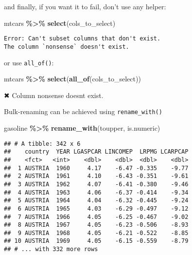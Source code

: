 \documentclass[
]{article}
\newenvironment{Shaded}{\begin{snugshade}}{\end{snugshade}}
\newcommand{\DataTypeTok}[1]{\textcolor[rgb]{0.13,0.29,0.53}{#1}}
\newcommand{\KeywordTok}[1]{\textcolor[rgb]{0.13,0.29,0.53}{\textbf{#1}}}
\newcommand{\NormalTok}[1]{#1}
\newcommand{\OperatorTok}[1]{\textcolor[rgb]{0.81,0.36,0.00}{\textbf{#1}}}
\newcommand{\StringTok}[1]{\textcolor[rgb]{0.31,0.60,0.02}{#1}}
\begin{document}
and finally, if you want it to fail, don't use any helper:

\begin{Shaded}
\begin{Highlighting}[]
\NormalTok{mtcars }\OperatorTok{\%\textgreater{}\%}
\StringTok{  }\KeywordTok{select}\NormalTok{(cols\_to\_select)}
\end{Highlighting}
\end{Shaded}

\begin{verbatim}
Error: Can't subset columns that don't exist.
The column `nonsense` doesn't exist.
\end{verbatim}

or use \texttt{all\_of()}:

\begin{Shaded}
\begin{Highlighting}[]
\NormalTok{mtcars }\OperatorTok{\%\textgreater{}\%}
\StringTok{  }\KeywordTok{select}\NormalTok{(}\KeywordTok{all\_of}\NormalTok{(cols\_to\_select))}
\end{Highlighting}
\end{Shaded}

\begin{Shaded}
\begin{Highlighting}[]
\NormalTok{✖ Column }\StringTok{\textasciigrave{}}\DataTypeTok{nonsense}\StringTok{\textasciigrave{}}\NormalTok{ doesn}\StringTok{\textquotesingle{}t exist.}
\end{Highlighting}
\end{Shaded}

Bulk-renaming can be achieved using \texttt{rename\_with()}

\begin{Shaded}
\begin{Highlighting}[]
\NormalTok{gasoline }\OperatorTok{\%\textgreater{}\%}
\StringTok{  }\KeywordTok{rename\_with}\NormalTok{(toupper, is.numeric)}
\end{Highlighting}
\end{Shaded}

\begin{verbatim}
## # A tibble: 342 x 6
##    country  YEAR LGASPCAR LINCOMEP  LRPMG LCARPCAP
##    <fct>   <int>    <dbl>    <dbl>  <dbl>    <dbl>
##  1 AUSTRIA  1960     4.17    -6.47 -0.335    -9.77
##  2 AUSTRIA  1961     4.10    -6.43 -0.351    -9.61
##  3 AUSTRIA  1962     4.07    -6.41 -0.380    -9.46
##  4 AUSTRIA  1963     4.06    -6.37 -0.414    -9.34
##  5 AUSTRIA  1964     4.04    -6.32 -0.445    -9.24
##  6 AUSTRIA  1965     4.03    -6.29 -0.497    -9.12
##  7 AUSTRIA  1966     4.05    -6.25 -0.467    -9.02
##  8 AUSTRIA  1967     4.05    -6.23 -0.506    -8.93
##  9 AUSTRIA  1968     4.05    -6.21 -0.522    -8.85
## 10 AUSTRIA  1969     4.05    -6.15 -0.559    -8.79
## # ... with 332 more rows
\end{verbatim}
\end{document}
